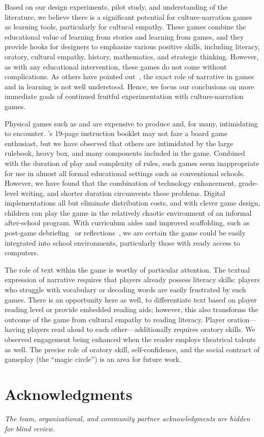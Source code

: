 \documentclass[a4paper]{article}
\begin{document}
Based on our design experiments, pilot study, and understanding of the
literature, we believe there is a significant potential for
culture-narration games as learning tools, particularly for
cultural empathy.
These games combine the educational value of learning from stories
and learning from games, and they provide hooks for designers to 
emphasize various positive skills, including literacy, 
oratory, cultural empathy, history, mathematics, and strategic thinking.
However, as with any educational intervention, these games do not
come without complications.
As others have pointed out~\citep[\textit{e.g.}]{Slota2015}, 
the exact role of narrative in games and in learning is not well
understood. Hence, we focus our conclusions on more immediate
goals of continued fruitful experimentation with culture-narration games.

Physical games such as \totan{} and \smersh{} are expensive to produce
and, for many, intimidating to encounter. \totan{}'s 19-page
instruction booklet may not faze a board game enthusiast, but we have
observed that others are intimidated by the large rulebook, heavy box,
and many components included in the game. Combined with the duration
of play and complexity of rules, such games seem inappropriate for use
in almost all formal educational settings such as conventional
schools.  However, we have found that the combination of technology
enhancement, grade-level writing, and shorter duration circumvents
these problems.  Digital implementations all but eliminate
distribution costs, and with clever game design, children can play the
game in the relatively chaotic environment of an informal after-school
program. With curriculum aides and improved scaffolding, such as
post-game debriefing~\citep{Nicholson2012}
or reflections~\citep{Hickey2013},
we are certain the game could be easily
integrated into school environments, particularly those with
ready access to computers.

The role of text within the game is worthy of particular attention.
The textual expression of narrative requires that players already possess
literacy skills: players who struggle with vocabulary or decoding words
are easily frustrated by such games. There is an opportunity
here as well, to differentiate text based on player reading level
or provide embedded reading aids; however, this also transforms
the outcome of the game from cultural empathy to reading literacy.
Player oration---having players read aloud to each
other---additionally requires oratory skills. We observed engagement
being enhanced when the reader employs theatrical talents as well.
The precise role of oratory skill, self-confidence, and the social
contract of gameplay (the ``magic circle'') is an area for future work.

\section{Acknowledgments}
\textit{The team, organizational, and community partner
  acknowledgments are hidden for blind review.}



\end{document}
